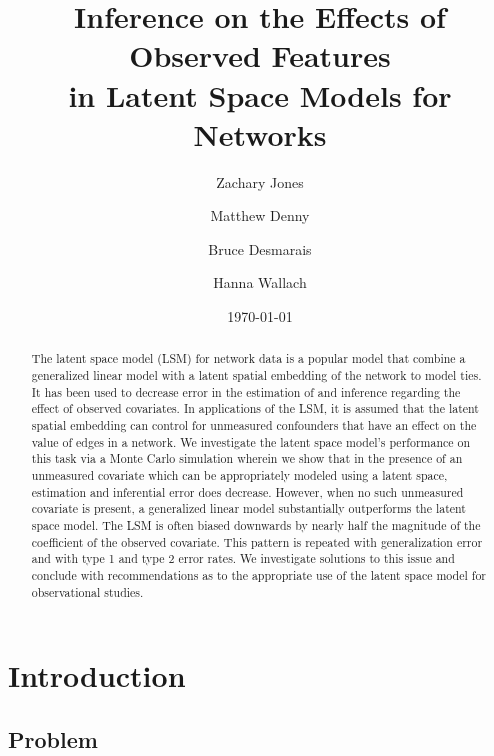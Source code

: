 \documentclass[12pt]{article}
\title{\vspace{-2cm} Inference on the Effects of Observed Features 
\\ in Latent Space Models for Networks }
\author{ Zachary Jones \and Matthew Denny \and Bruce Desmarais \and Hanna Wallach} \date{\today}
\begin{document}
\maketitle




\begin{abstract}

\noindent The latent space model (LSM) for network data is a popular model that combine a generalized linear model with a latent spatial embedding of the network to model ties. It has been used to decrease error in the estimation of and inference regarding the effect of observed covariates. In applications of the LSM, it is assumed that the latent spatial embedding can control for unmeasured confounders that have an effect on the value of edges in a network. We investigate the latent space model's performance on this task via a Monte Carlo simulation wherein we show that in the presence of an unmeasured covariate which can be appropriately modeled using a latent space, estimation and inferential error does decrease. However, when no such unmeasured covariate is present, a generalized linear model substantially outperforms the latent space model. The LSM is often biased downwards by nearly half the magnitude of the coefficient of the observed covariate. This pattern is repeated with generalization error and with type 1 and type 2 error rates. We investigate solutions to this issue and conclude with recommendations as to the appropriate use of the latent space model for observational studies.

\end{abstract}
\thispagestyle{empty}
\section{Introduction}

\subsection{Problem}
\end{document}
